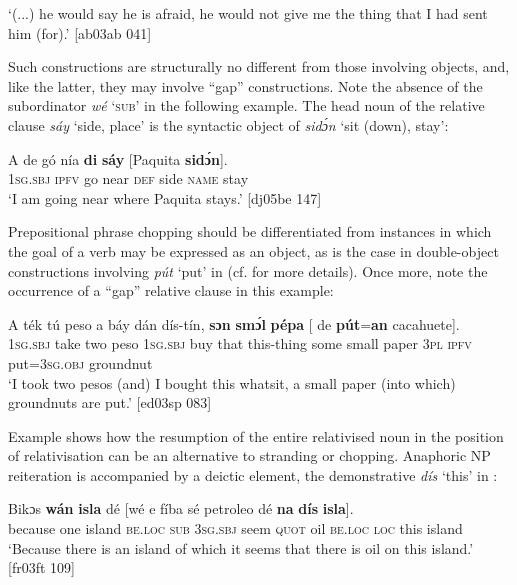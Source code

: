 \glt ‘(...) he would say he is afraid, he would not give me the thing that I had sent 
him (for).’ [ab03ab 041]
\z

Such constructions are structurally no different from those involving objects, and, like the latter, they may involve “gap” constructions. Note the absence of the subordinator \textit{wé} ‘\textsc{sub}’ in the following example. The head noun of the relative clause \textit{sáy} ‘side, place’ is the syntactic object of \textit{sidɔ́n} ‘sit (down), stay’: 


\ea%
    \label{ex:key:1443}
    \gll A    de  gó  nía    \textbf{di}  \textbf{sáy}  [Paquita  \textbf{sidɔ́n}].\\
\textsc{1sg.sbj}  \textsc{ipfv}  go  near    \textsc{def}  side   \phantom{[}\textsc{name}  stay\\

\glt ‘I am going near where Paquita stays.’ [dj05be 147]
\z

Prepositional phrase chopping should be differentiated from instances in which the goal of a verb may be expressed as an object, as is the case in double-object constructions involving \textit{pút} ‘put’ in  (cf.  for more details). Once more, note the occurrence of a “gap” relative clause in this example: 


\ea%
    \label{ex:key:1444}
    \gll A    ték    tú  peso    a    báy  dán    dís-tín,  
\textbf{sɔn}    \textbf{smɔ́l}  \textbf{pépa}  [    de  \textbf{pút}=\textbf{an}    cacahuete].\\
\textsc{1sg.sbj}  take    two  peso    \textsc{1sg.sbj}  buy  that    this-thing
some  small  paper   \phantom{[}\textsc{3pl}    \textsc{ipfv}  put=\textsc{3sg.obj}  groundnut\\

\glt ‘I took two pesos (and) I bought this whatsit, a small paper 
(into which) groundnuts are put.’ [ed03sp 083]
\z

Example  shows how the resumption of the entire relativised noun in the position of relativisation can be an alternative to stranding or chopping. Anaphoric \textsc{NP} reiteration is accompanied by a deictic element, the demonstrative \textit{dís} ‘this’ in :


\ea%
    \label{ex:key:1445}
    \gll Bikɔs  \textbf{wán}    \textbf{isla} dé    [wé  e    fíba    sé
petroleo  dé    \textbf{na}  \textbf{dís}  \textbf{isla}].\\
because  one    island  \textsc{be.loc}   \phantom{[}\textsc{sub}  \textsc{3sg.sbj}  seem  \textsc{quot}
oil    \textsc{be.loc}  \textsc{loc}  this  island\\
\glt ‘Because there is an island of which it seems that there is oil 
on this island.’ [fr03ft 109]
\z

